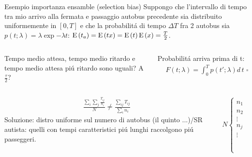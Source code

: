 \documentclass[asd-beamer.tex]{subfiles}%
\begin{document}
\begin{wordonframe}{Esempio importanza ensamble (selection bias)}
	Suppongo che l'intervallo di tempo tra mio arrivo alla fermata e passaggio autobus precedente sia distribuito uniformemente in $[0,T]$ e che la probabilit\'a di tempo $\Delta T$ fra 2 autobus sia  $p(t;\lambda)=\lambda\exp{-\lambda t}$: $\operatorname{E}{(t_a)}=\operatorname{E}{(tx)}=\operatorname{E}{(t)}\operatorname{E}{(x)}=\frac{T}{2}$.
	\begin{columns}[T]
		\begin{column}{0.4\textwidth}
			Tempo medio attesa, tempo medio ritardo e tempo medio attesa pi\'u ritardo sono uguali? A $\frac{\tau}{2}$?
		\end{column}
		\begin{column}{0.6\textwidth}
			Probabilit\'a arriva prima di t:
			\begin{align*}
			&F(t;\lambda)=\int_0^Tp(t';\lambda)d\,t=1-F(T)=1-\exp{-\lambda T}
			\end{align*}
		\end{column}
	\end{columns}
	\begin{columns}[T]
		\begin{column}{0.55\textwidth}
			\begin{align*}
			&\frac{\sum_i\sum_j\frac{T_{ij}}{n_i}}{N}\neq\frac{\sum_{ij}T_{ij}}{\sum_in_i}
			\end{align*}
			Soluzione: distro uniforme sul numero di autobus (il quinto ...)/SR autista: quelli con tempi caratteristici pi\'u lunghi raccolgono pi\'u passeggeri.
		\end{column}
		\begin{column}{0.45\textwidth}
			\begin{align*}
			&N\left\{\begin{array}{cccc}
			n_1&T_1&\ldots&T_{n_1}\\
			n_2&&&\\
			\vdots&&&\\
			n_j&&&\\
			\vdots&&&\\
			&\frac{T}{2}&\ldots&\frac{T}{2}\\
			\end{array}\right.
			\end{align*}
		\end{column}
	\end{columns}
\end{wordonframe}
\end{document}
